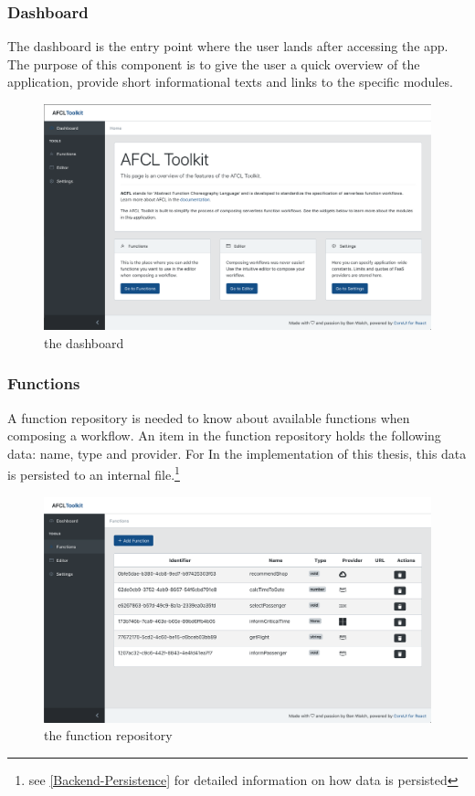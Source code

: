 \documentclass[a4paper,11pt,pdftex,halfparskip,cleardoubleempty,bibtotoc,liststotoc]{scrbook}
\begin{document}
\subsubsection{Dashboard}

The dashboard is the entry point where the user lands after accessing the app. The purpose of this component is to give the user a quick overview of the application, provide short informational texts and links to the specific modules. 

\begin{figure}[H]
  \centering
  \includegraphics[width=\textwidth]{dashboard}
  \caption{the dashboard}
\end{figure}

\subsubsection{Functions}

A function repository is needed to know about available functions when composing a workflow. An item in the function repository holds the following data: name, type and provider. For In the implementation of this thesis, this data is persisted to an internal file.\footnote{see \ref{Backend-Persistence} for detailed information on how data is persisted}

\begin{figure}[H]
  \centering
  \includegraphics[width=\textwidth]{functions}
  \caption{the function repository}
\end{figure}
\end{document}
